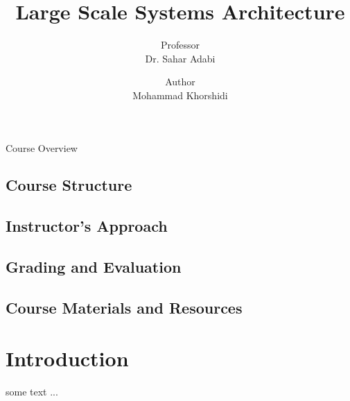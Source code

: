 \documentclass[a4paper, 10pt]{book}
\title{\huge {\bold Large Scale Systems Architecture}}
\author{Professor\\{\bold Dr. Sahar Adabi}}
\date{Author\\{\bold Mohammad Khorshidi}}
\begin{document}
    \maketitle
    \newpage

    \begin{center}
        \Large {\bold Course Overview}
    \end{center}

    \section{Course Structure}

    \section{Instructor's Approach}

    \section{Grading and Evaluation}

    \section{Course Materials and Resources}

    \tableofcontents
    
    \chapter{{\bold Introduction}}


        some text ...
\end{document}
